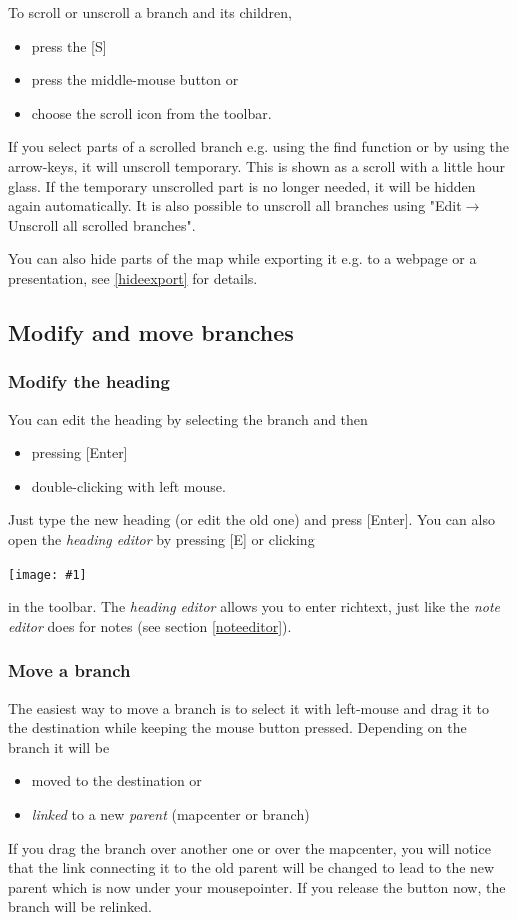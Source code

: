 \documentclass[12pt,a4paper]{article}
\newcommand{\maximage}[1]{  
    \begin{center}
        \texttt{[image: \#1]} 
    \end{center}
}
\newcommand{\ra}{$\longrightarrow$}
\newcommand{\key}[1]{[#1]}
\begin{document}
To scroll or unscroll a branch and its children,
\begin{itemize}
    \item press the \key{S}
    \item press the middle-mouse button or
    \item choose the scroll icon from the toolbar.
\end{itemize}
If you select parts of a scrolled branch e.g. using the find function or
by using the arrow-keys, it will unscroll temporary. This is shown as a
scroll with a little hour glass. If the temporary unscrolled part is no
longer needed, it will be hidden again automatically. It is also
possible to unscroll all branches using "Edit\ra Unscroll all scrolled
branches".

You can also hide parts of the map while exporting it e.g. to a webpage
or a presentation, see \ref{hideexport} for details.

\subsection{Modify and move branches}
\subsubsection*{Modify the heading}  \label{editheading}
You can edit the heading by selecting the branch and then
\begin{itemize}
    \item pressing \key{Enter}
    \item double-clicking with left mouse.
\end{itemize}
Just type the new heading (or edit the old one) and press \key{Enter}.
You can also open the {\em heading editor} by pressing \key{E} or
clicking 
\maximage{images/headingeditor.png}
in the toolbar. The {\em heading editor} allows you to enter richtext, just
like the {\em note editor} does for notes (see section \ref{noteeditor}).

\subsubsection*{Move a branch}
The easiest way to move a branch is to select it with left-mouse and
drag it to the destination while keeping the mouse button pressed.
Depending on the branch  it will be
\begin{itemize}
    \item moved to the destination or
    \item {\em linked} to a new {\em parent} (mapcenter or branch)
\end{itemize}
If you drag the branch over another one or over the mapcenter, you will
notice that the  link connecting it to the old parent will be changed to
lead to the  new parent which is now under your mousepointer.  If you
release the button now, the branch will be relinked.
\end{document}

